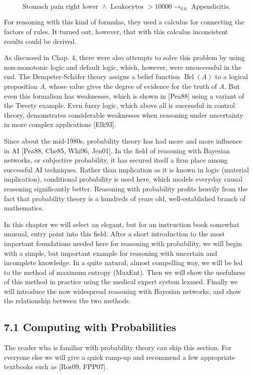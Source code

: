 \documentclass[10pt]{article}
\begin{document}
$$
\text { Stomach pain right lower } \wedge \text { Leukocytes }>10000 \rightarrow_{0.6} \text { Appendicitis. }
$$

For reasoning with this kind of formulas, they used a calculus for connecting the factors of rules. It turned out, however, that with this calculus inconsistent results could be derived.

As discussed in Chap. 4, there were also attempts to solve this problem by using non-monotonic logic and default logic, which, however, were unsuccessful in the end. The Dempster-Schäfer theory assigns a belief function $\operatorname{Bel}(A)$ to a logical proposition $A$, whose value gives the degree of evidence for the truth of $A$. But even this formalism has weaknesses, which is shown in [Pea88] using a variant of the Tweety example. Even fuzzy logic, which above all is successful in control theory, demonstrates considerable weaknesses when reasoning under uncertainty in more complex applications [Elk93].


Since about the mid-1980s, probability theory has had more and more influence in AI [Pea88, Che85, Whi96, Jen01]. In the field of reasoning with Bayesian networks, or subjective probability, it has secured itself a firm place among successful AI techniques. Rather than implication as it is known in logic (material implication), conditional probability is used here, which models everyday causal reasoning significantly better. Reasoning with probability profits heavily from the fact that probability theory is a hundreds of years old, well-established branch of mathematics.

In this chapter we will select an elegant, but for an instruction book somewhat unusual, entry point into this field. After a short introduction to the most important foundations needed here for reasoning with probability, we will begin with a simple, but important example for reasoning with uncertain and incomplete knowledge. In a quite natural, almost compelling way, we will be led to the method of maximum entropy (MaxEnt). Then we will show the usefulness of this method in practice using the medical expert system lexmed. Finally we will introduce the now widespread reasoning with Bayesian networks, and show the relationship between the two methods.

\subsection*{7.1 Computing with Probabilities}
The reader who is familiar with probability theory can skip this section. For everyone else we will give a quick ramp-up and recommend a few appropriate textbooks such as [Ros09, FPP07].
\end{document}
